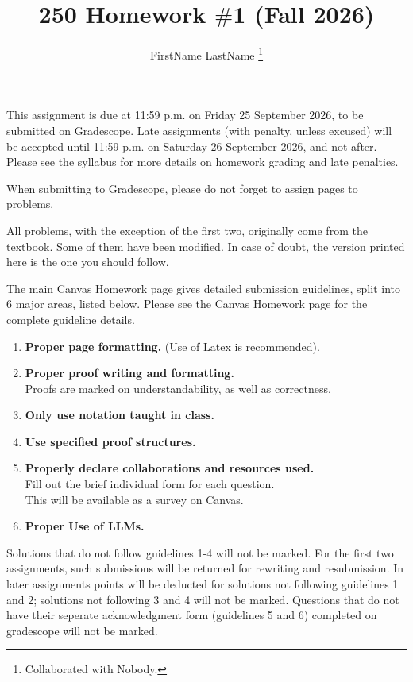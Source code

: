 \documentclass[12pt]{article}
\title{250 Homework $\#$1 (Fall  2026)}
\author{FirstName LastName \footnote{Collaborated with Nobody.}}
\begin{document}
\date{}
\maketitle
This assignment is due at 11:59 p.m. on Friday 25 September 2026, to 
be submitted on Gradescope.  Late assignments (with penalty, unless
excused) will be accepted until
11:59 p.m. on Saturday 26 September 2026, and not after.  Please see
the syllabus for more details on homework grading and late penalties.

\medskip

When submitting to Gradescope, please do not forget to assign pages to problems.

\medskip

All problems, with the exception of the first two,  originally come from the textbook. Some of them have been modified.  In case of doubt, the version printed here is the one you should follow.

\bigskip



The main Canvas Homework page gives detailed submission guidelines, split into 6 major areas, listed below.  Please see the Canvas Homework page for the complete  guideline details.




\begin{enumerate}
\item {\bf Proper page formatting.}
(Use of Latex is recommended).
\item {\bf Proper proof writing and formatting.}\\
Proofs are marked on understandability, as well as correctness.
\item {\bf Only use notation taught in class.}
\item {\bf Use specified  proof structures. }
\item {\bf Properly declare collaborations and resources used.}\\
Fill out the brief individual form for each question.\\
This will be available as a survey on Canvas.
\item {\bf Proper Use of LLMs.}
\end{enumerate}

Solutions that do not follow guidelines  1-4 will not be marked.
For the first two assignments, such submissions will be returned for rewriting and resubmission. In later assignments  points will be deducted for solutions not following guidelines 1 and  2;   solutions not following 3 and 4 will not be marked.
Questions that do not have their seperate acknowledgment form (guidelines 5 and 6) completed on gradescope will not be marked.
\end{document}
